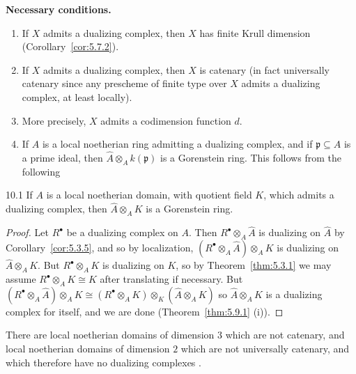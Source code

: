 \medskip\noindent\textbf{Necessary conditions.}
\begin{enumerate}
\item If $X$ admits a dualizing complex, then $X$ has finite Krull dimension (Corollary~\ref{cor:5.7.2}).
\item If $X$ admits a dualizing complex, then $X$ is catenary (in fact universally catenary since any prescheme of finite type over $X$ admits a dualizing complex, at least locally).
\item More precisely, $X$ admits a codimension function $d$.
\item If $A$ is a local noetherian ring admitting a dualizing complex, and if $\mathfrak{p}\subseteq A$ is a prime ideal, then $\widehat{A}\otimes_A k(\mathfrak{p})$ is a Gorenstein ring. This follows from the following
\end{enumerate}

\begin{bookproposition}{10.1}\label{prop:5.10.1}
If $A$ is a local noetherian domain, with quotient field $K$, which admits a dualizing complex, then $\widehat{A}\otimes_A K$ is a Gorenstein ring.
\end{bookproposition}

\begin{proof}
Let $R^\bullet$ be a dualizing complex on $A$. Then $R^\bullet\otimes_A\widehat{A}$ is dualizing on $\widehat{A}$ by Corollary~\ref{cor:5.3.5}, and so by localization, $(R^\bullet\otimes_A\widehat{A})\otimes_A K$ is dualizing on $\widehat{A}\otimes_A K$. But $R^\bullet\otimes_A K$ is dualizing on $K$, so by Theorem~\ref{thm:5.3.1} we may assume $R^\bullet\otimes_A K\cong K$ after translating if necessary. But $(R^\bullet\otimes_A\widehat{A})\otimes_A K \cong (R^\bullet\otimes_A K)\otimes_K (\widehat{A}\otimes_A K)$ so $\widehat{A}\otimes_A K$ is a dualizing complex for itself, and we are done (Theorem~\ref{thm:5.9.1} (i)).
\end{proof}

\begin{example*}
There are local noetherian domains of dimension $3$ which are not catenary, and local noetherian domains of dimension $2$ which are not universally catenary, and which therefore have no dualizing complexes \cite[\nopp App.~A1, Ex.~2]{14}.
\end{example*}

